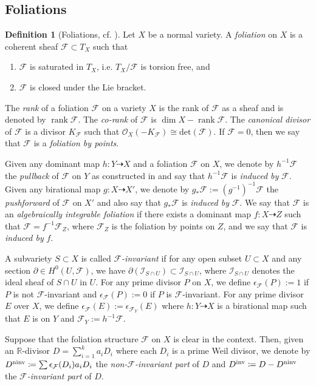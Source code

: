 \documentclass[11pt]{amsart}
\numberwithin{equation}{section}
\newcommand{\rk}{\operatorname{rank}}
\newcommand{\Ff}{\mathcal{F}}
\theoremstyle{definition}
\newtheorem{defn}[thm]{Definition}
\theoremstyle{definition}
\theoremstyle{definition}
\begin{document}
\subsection{Foliations}

\begin{defn}[Foliations, {cf. \cite{ACSS21,CS21}}]\label{defn: foliation}
Let $X$ be a normal variety. A \emph{foliation} on $X$ is a coherent sheaf $\Ff\subset T_X$ such that
\begin{enumerate}
    \item $\Ff$ is saturated in $T_X$, i.e. $T_X/\Ff$ is torsion free, and
    \item $\Ff$ is closed under the Lie bracket.
\end{enumerate}

The \emph{rank} of a foliation $\Ff$ on a variety $X$ is the rank of $\Ff$ as a sheaf and is denoted by $\rk\Ff$. 
The \emph{co-rank} of $\Ff$ is $\dim X-\rk\Ff$. The \emph{canonical divisor} of $\Ff$ is a divisor $K_\Ff$ such that $\mathcal{O}_X(-K_{\mathcal{F}})\cong\mathrm{det}(\Ff)$. If $\Ff=0$, then we say that $\Ff$ is a \emph{foliation by points}.

Given any dominant map 
$h: Y\dashrightarrow X$ and a foliation $\mathcal F$ on $X$, we denote by $h^{-1}\Ff$ the \emph{pullback} of $\Ff$ on $Y$ as constructed in \cite[3.2]{Dru21} and say that $h^{-1}\Ff$ is \emph{induced by} $\Ff$. Given any birational map $g: X\dashrightarrow X'$, we denote by $g_\ast \Ff:=(g^{-1})^{-1}\Ff$ the \emph{pushforward} of $\Ff$ on $X'$ and also say that $g_\ast \Ff$ is \emph{induced by} $\Ff$. We say that $\Ff$ is an \emph{algebraically integrable foliation} if there exists a dominant map $f: X\dashrightarrow Z$ such that $\Ff=f^{-1}\Ff_Z$, where $\Ff_Z$ is the foliation by points on $Z$, and we say that $\Ff$ is \emph{induced by} $f$.

A subvariety $S\subset X$ is called \emph{$\Ff$-invariant} if for any open subset $U\subset X$ and any section $\partial\in H^0(U,\Ff)$, we have $\partial(\mathcal{I}_{S\cap U})\subset \mathcal{I}_{S\cap U}$,  where $\mathcal{I}_{S\cap U}$ denotes the ideal sheaf of $S\cap U$ in $U$.  
For any prime divisor $P$ on $X$, we define $\epsilon_{\Ff}(P):=1$ if $P$ is not $\Ff$-invariant and $\epsilon_{\Ff}(P):=0$ if $P$ is $\Ff$-invariant. For any prime divisor $E$ over $X$, we define $\epsilon_{\Ff}(E):=\epsilon_{\Ff_Y}(E)$ where $h: Y\dashrightarrow X$ is a birational map such that $E$ is on $Y$ and $\Ff_Y:=h^{-1}\Ff$.

Suppose that the foliation structure $\Ff$ on $X$ is clear in the context. Then, given an $\mathbb R$-divisor $D = \sum_{i = 1}^k a_iD_i$ where each $D_i$ is a prime Weil divisor,
we denote by $D^{{\rm ninv}} \coloneqq \sum \epsilon_{\mathcal F}(D_i)a_iD_i$ the \emph{non-$\Ff$-invariant part} of $D$ and $D^{{\rm inv}} \coloneqq D-D^{{\rm ninv}}$ the \emph{$\Ff$-invariant part} of $D$.
\end{defn}
\end{document}
